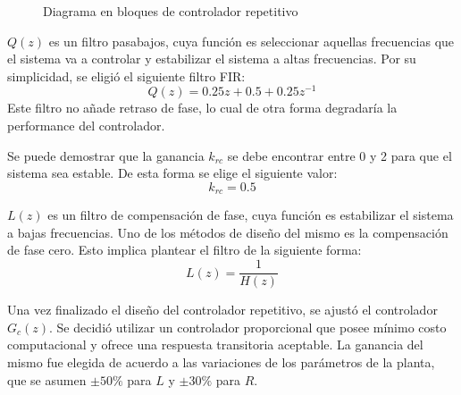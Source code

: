 \documentclass[../et.tex]{subfiles}
\begin{document}
\begin{figure}[!htbp]
  \centering
  \caption{Diagrama en bloques de controlador repetitivo}
  \label{fig:control-esquema-repetitivo}
\end{figure}

$Q(z)$ es un filtro pasabajos, cuya función es seleccionar aquellas frecuencias que el sistema va a controlar y estabilizar el sistema a altas frecuencias. Por su simplicidad, se eligió el siguiente filtro FIR:
\[
    Q(z) = 0.25 z + 0.5 + 0.25 z^{-1}
\]
Este filtro no añade retraso de fase, lo cual de otra forma degradaría la performance del controlador.

Se puede demostrar que la ganancia $k_{rc}$ se debe encontrar entre 0 y 2 para que el sistema sea estable. De esta forma se elige el siguiente valor:
\[
    k_{rc} = 0.5
\]

$L(z)$ es un filtro de compensación de fase, cuya función es estabilizar el sistema a bajas frecuencias. Uno de los métodos de diseño del mismo es la compensación de fase cero. Esto implica plantear el filtro de la siguiente forma:
\[
    L(z) = \frac{1}{H(z)}
\]

Una vez finalizado el diseño del controlador repetitivo, se ajustó el controlador $G_c(z)$. Se decidió utilizar un controlador proporcional que posee mínimo costo computacional y ofrece una respuesta transitoria aceptable. La ganancia del mismo fue elegida de acuerdo a las variaciones de los parámetros de la planta, que se asumen $\pm 50\%$ para $L$ y $\pm 30\%$ para $R$.
\end{document}
